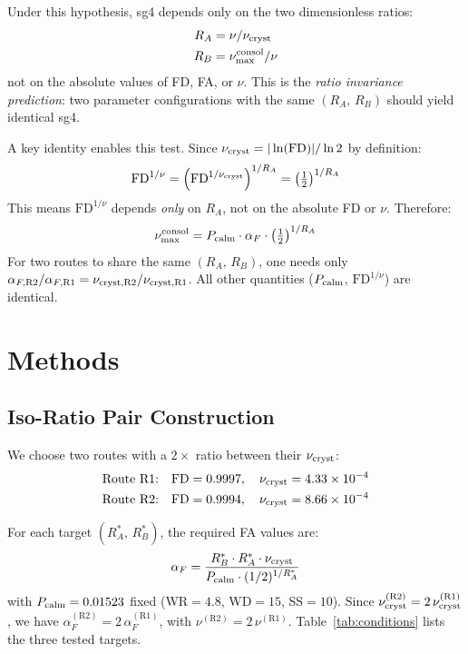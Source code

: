 \documentclass[11pt]{article}
\begin{document}
Under this hypothesis, sg4 depends only on the two dimensionless ratios:
\begin{align}
R_A &= \nu / \nu_{\rm cryst} \label{eq:ra}\\
R_B &= \nu_{\rm max}^{\rm consol} / \nu \label{eq:rb}
\end{align}
not on the absolute values of FD, FA, or $\nu$. This is the \emph{ratio
invariance prediction}: two parameter configurations with the same $(R_A,\,R_B)$
should yield identical sg4.

A key identity enables this test. Since
$\nu_{\rm cryst} = |\ln(\text{FD})|/\ln 2$ by definition:
\begin{equation}
\text{FD}^{1/\nu} = \left(\text{FD}^{1/\nu_{\rm cryst}}\right)^{1/R_A}
= \left(\tfrac{1}{2}\right)^{1/R_A}
\label{eq:key_identity}
\end{equation}
This means $\text{FD}^{1/\nu}$ depends \emph{only} on $R_A$, not on the
absolute FD or $\nu$. Therefore:
\[
\nu_{\rm max}^{\rm consol}
= P_{\rm calm} \cdot \alpha_F \cdot \left(\tfrac{1}{2}\right)^{1/R_A}
\]
For two routes to share the same $(R_A,\,R_B)$, one needs only
$\alpha_{F,\text{R2}}/\alpha_{F,\text{R1}} = \nu_{{\rm cryst},\text{R2}}/\nu_{{\rm cryst},\text{R1}}$.
All other quantities ($P_{\rm calm}$, $\text{FD}^{1/\nu}$) are identical.

\section{Methods}

\subsection{Iso-Ratio Pair Construction}

We choose two routes with a $2\times$ ratio between their $\nu_{\rm cryst}$:
\begin{align*}
\text{Route R1:}\quad &\text{FD} = 0.9997,\quad \nu_{\rm cryst} = 4.33\times10^{-4}\\
\text{Route R2:}\quad &\text{FD} = 0.9994,\quad \nu_{\rm cryst} = 8.66\times10^{-4}
\end{align*}

For each target $(R_A^*,\,R_B^*)$, the required FA values are:
\[
\alpha_{F} = \frac{R_B^* \cdot R_A^* \cdot \nu_{\rm cryst}}{P_{\rm calm} \cdot (1/2)^{1/R_A^*}}
\]
with $P_{\rm calm} = 0.01523$ fixed (WR$=4.8$, WD$=15$, SS$=10$).
Since $\nu_{\rm cryst}^{(\text{R2})} = 2\,\nu_{\rm cryst}^{(\text{R1})}$, we have
$\alpha_F^{(\text{R2})} = 2\,\alpha_F^{(\text{R1})}$, with $\nu^{(\text{R2})} = 2\,\nu^{(\text{R1})}$.
Table~\ref{tab:conditions} lists the three tested targets.
\end{document}
